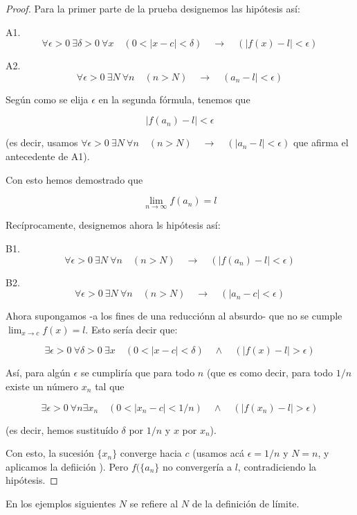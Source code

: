 \documentclass[12pt,a4paper]{article}
\begin{document}
\begin{proof}
Para la primer parte de la prueba designemos las hip\'otesis as\'i:

A1.
\[ \forall \epsilon > 0 \ \exists \delta > 0 \ \forall x \quad
(0<|x-c|< \delta) \quad \to \quad (|f(x) - l| < \epsilon) \]

A2. 
\[ \forall \epsilon > 0 \ \exists N \ \forall n \quad  (n > N) \quad \to \quad (a_n - l| < \epsilon) \]

Seg\'un como se elija \( \epsilon \) en la segunda f\'ormula, tenemos
que 


\[ | f(a_n) - l | < \epsilon \]

(es decir, usamos \( \forall \epsilon > 0 \ \exists N \ \forall n
\quad  (n > N) \quad \to \quad (|a_n - l| < \epsilon) \)
que afirma el antecedente de A1).

Con esto hemos demostrado que

\[ \lim_{n \to \infty} f( a_n )= l \]

Rec\'iprocamente, designemos ahora ls hip\'otesis as\'i:

B1. 
\[ \forall \epsilon > 0 \ \exists N \ \forall n \quad  (n > N) \quad
\to \quad ( |f(a_n) - l| < \epsilon) \]

B2.
\[ \forall \epsilon > 0 \ \exists N \ \forall n \quad  (n > N) \quad
\to \quad ( |a_n - c| < \epsilon) \]

Ahora supongamos -a los fines de una reducci\'onn al absurdo- que no
se cumple \( \lim_{x \to c} f( x )= l \). Esto ser\'ia decir que:


\[ \exists \epsilon > 0 \ \forall \delta > 0 \ \exists x \quad
(0<|x-c|< \delta) \quad \wedge \quad (|f(x) - l| > \epsilon) \]

As\'i, para alg\'un \( \epsilon \) se cumplir\'ia que para todo \( n
\) (que es como decir, para todo \( 1/n \) existe un n\'umero \( x_n
\) tal que 

\[ \exists \epsilon > 0 \ \forall n \exists x_n \quad
(0<|x_n-c|< 1/n) \quad \wedge \quad (|f(x_n) - l| > \epsilon) \]

(es decir, hemos sustitu\'ido \( \delta \) por \( 1/n \) y \( x \) por
\( x_n \)).

Con esto, la sucesi\'on \( \{ x_n \} \) converge hacia \( c \) (usamos
ac\'a \( \epsilon = 1/n \) y \( N = n \), y aplicamos la defiici\'on
). Pero \( f( \{ a_n \} \) no converger\'ia a \( l \),
contradiciendo la hip\'otesis.
\end{proof}

En los ejemplos siguientes \( N \) se refiere al \( N \) de la definici\'on
de l\'imite.
\end{document}
